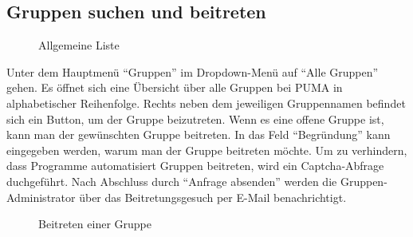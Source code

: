 \subsection{Gruppen suchen und beitreten}
\label{subsec:gruppenSuchenBeitreten}

\begin{figure}[h!]
 \centering
 \caption{Allgemeine Liste}
 \label{fig:allgemeineListe}
\end{figure}

Unter dem Hauptmenü \enquote{Gruppen} im Dropdown-Menü auf \enquote{Alle Gruppen} gehen. Es öffnet sich eine Übersicht über alle Gruppen bei PUMA in alphabetischer Reihenfolge. Rechts neben dem jeweiligen Gruppennamen befindet sich ein Button, um der Gruppe beizutreten. Wenn es eine offene Gruppe ist, kann man der gewünschten Gruppe beitreten. In das Feld \enquote{Begründung} kann eingegeben werden, warum man der Gruppe beitreten möchte. Um zu verhindern, dass Programme automatisiert Gruppen beitreten, wird ein Captcha-Abfrage duchgeführt. Nach Abschluss durch \enquote{Anfrage absenden} werden die Gruppen-Administrator über das Beitretungsgesuch per E-Mail benachrichtigt.
	
\begin{figure}[h!]
 \centering
 \caption{Beitreten einer Gruppe}
 \label{fig:gruppeBeitreten}
\end{figure}

